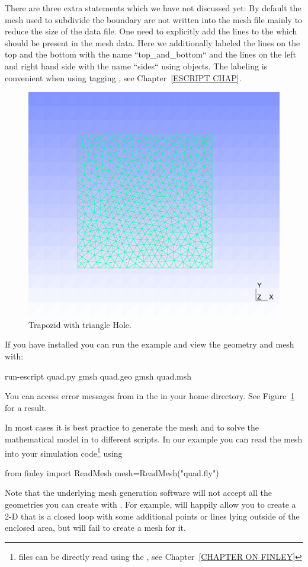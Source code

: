 There are three extra statements which we have not discussed yet: By default the mesh used to subdivide 
the boundary are not written into the mesh file mainly to reduce the size of the data file. One need to explicitly add the lines to the  \Design which should be present in the mesh data. Here we additionally labeled the 
lines on the top and the bottom with the name ``top_and_bottom`` and the lines on the left and right hand side 
with the name ``sides`` using  objects. The labeling is convenient 
when using tagging , see Chapter~\ref{ESCRIPT CHAP}. 

\begin{figure}
\centerline{\includegraphics[width=\figwidth]{figures/quad}}
\caption{Trapozid with triangle Hole.}
\label{fig:PYCAD 0}
\end{figure}

If you have \gmshextern installed you can run the example and view the geometry and mesh with:
\begin{python}
run-escript quad.py
gmsh quad.geo
gmsh quad.msh
\end{python}
You can access error messages from \gmshextern in the  in your home directory.
See Figure~\ref{fig:PYCAD 0} for a result.

In most cases it is best practice to generate the mesh and to solve the mathematical 
model in to different scripts. In our example you can read the \finley mesh into your simulation
code\footnote{\gmshextern files can be directly read using the , see Chapter~\ref{CHAPTER ON FINLEY}} using
\begin{python}
from finley import ReadMesh
mesh=ReadMesh("quad.fly")
\end{python}
Note that the underlying mesh generation software will not accept all
the geometries you can create with \pycad.  For example, \pycad
will happily allow you to create a 2-D  that is a
closed loop with some additional points or lines lying outside of the
enclosed area, but \gmshextern will fail to create a mesh for it.

